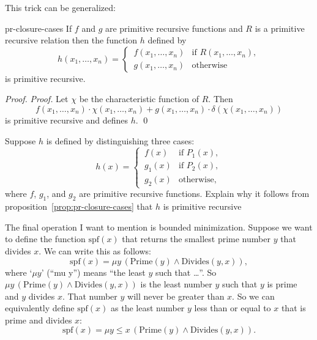 This trick can be generalized:

\begin{proposition}{}{pr-closure-cases}
  If $f$ and $g$ are primitive recursive functions
  and $R$ is a primitive recursive relation
  then the function $h$ defined by
  \[
    h(x_1, \ldots, x_n) =
    \begin{cases}
      \,f(x_1, \ldots, x_n) & \text{if } R(x_1, \ldots, x_n),\\
      \,g(x_1, \ldots, x_n) & \text{otherwise}
    \end{cases}
  \]
  is primitive recursive.
\end{proposition}
\begin{proof}
  \emph{Proof.}
  Let $\chi$ be the characteristic function of $R$.
  Then
  \[
    f(x_1, \ldots, x_n) \cdot \chi(x_1, \ldots, x_n) + g(x_1, \ldots, x_n) \cdot \delta(\chi(x_1, \ldots, x_n))
  \]
  is primitive recursive and defines $h$. \qed
\end{proof}

\begin{exercise}
  Suppose $h$ is defined by distinguishing three cases:
  \[
    h(x) =
    \begin{cases}
      \,f(x) & \text{if } P_1(x),\\
      \,g_1(x) & \text{if } P_2(x),\\
      \,g_2(x) & \text{otherwise},
    \end{cases}
  \]
  where $f$, $g_1$, and $g_2$ are primitive recursive functions.
  Explain why it follows from proposition~\ref{prop:pr-closure-cases} that $h$ is primitive recursive
\end{exercise}

The final operation I want to mention is bounded minimization.
Suppose we want to define
the function $\mathrm{spf}(x)$
that returns the smallest prime number $y$ that divides $x$.
We can write this as follows:
\[
  \mathrm{spf}(x) = \mu y \,(\mathrm{Prime}(y) \land \text{Divides}(y,x)),
\]
where `$\mu y$' (``mu y'') means ``the least $y$ such that \ldots''.
So $\mu y\,(\mathrm{Prime}(y) \land \text{Divides}(y,x))$ is the least number $y$
such that $y$ is prime and $y$ divides $x$.
That number $y$ will never be greater than $x$.
So we can equivalently define $\mathrm{spf}(x)$ as the
least number $y$ less than or equal to $x$ that is prime and divides $x$:
\[
  \mathrm{spf}(x) = \mu y \leq x \,(\mathrm{Prime}(y) \land \text{Divides}(y,x)).
\]

